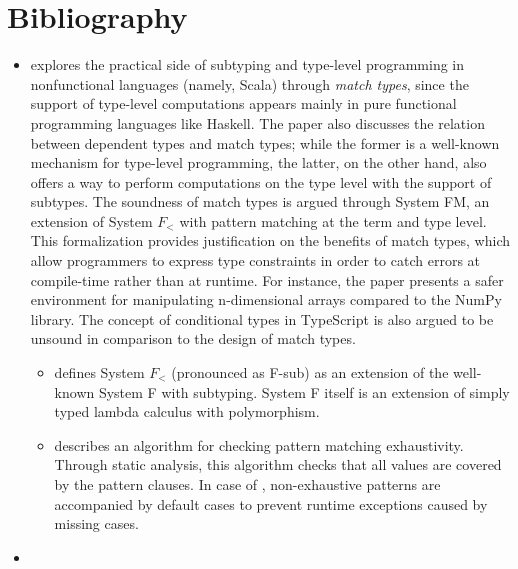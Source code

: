 \hypertarget{bibliography}{%
    \section*{Bibliography}\label{bibliography}}

\begin{itemize}
\tightlist
\item
  \cite{match} explores the practical side of subtyping and type-level programming in nonfunctional languages (namely, Scala) through \emph{match types}, since the support of type-level computations appears mainly in pure functional programming languages like Haskell. The paper also discusses the relation between dependent types and match types; while the former is a well-known mechanism for type-level programming, the latter, on the other hand, also offers a way to perform computations on the type level with the support of subtypes. The soundness of match types is argued through System FM, an extension of System $F_\lt$ with pattern matching at the term and type level. This formalization provides justification on the benefits of match types, which allow programmers to express type constraints in order to catch errors at compile-time rather than at runtime. For instance, the paper presents a safer environment for manipulating n-dimensional arrays compared to the NumPy library. The concept of conditional types in TypeScript is also argued to be unsound in comparison to the design of match types.
  \begin{itemize}
      \item \cite{sysfsub} defines System $F_\lt$ (pronounced as F-sub) as an extension of the well-known System F with subtyping. System F itself is an extension of simply typed lambda calculus with polymorphism.
      \item \cite{exhaustive} describes an algorithm for checking pattern matching exhaustivity. Through static analysis, this algorithm checks that all values are covered by the pattern clauses. In case of \cite{match}, non-exhaustive patterns are accompanied by default cases to prevent runtime exceptions caused by missing cases.
  \end{itemize}
\item 

\end{itemize}
